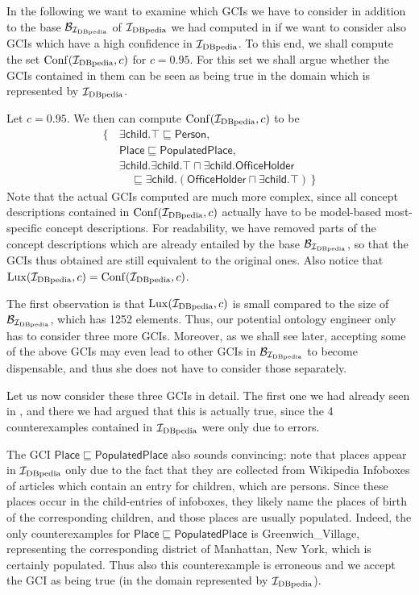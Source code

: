 In the following we want to examine which GCIs we have to consider in addition to the base
$\mathcal{B}_{{\mathcal{I}_{\text{DBpedia}}}}$ of ${\mathcal{I}_{\text{DBpedia}}}$ we had computed in
 if we want to consider also GCIs which have a high
confidence in ${\mathcal{I}_{\text{DBpedia}}}$.  To this end, we shall compute the set $\operatorname{Conf}({\mathcal{I}_{\text{DBpedia}}}, c)$
for $c = 0.95$.  For this set we shall argue whether the GCIs contained in them can be
seen as being true in the domain which is represented by ${\mathcal{I}_{\text{DBpedia}}}$.

Let $c = 0.95$.  We then can compute $\operatorname{Conf}({\mathcal{I}_{\text{DBpedia}}}, c)$ to be
\begin{align*}
  \{\,
  & \mathsf{\exists child. \top} \sqsubseteq \mathsf{Person}, \\
  & \mathsf{Place} \sqsubseteq \mathsf{PopulatedPlace},\\
  & \mathsf{\exists child. \exists child. \top} \sqcap \mathsf{\exists
    child. OfficeHolder} \\
  & \quad \sqsubseteq \mathsf{\exists child. (OfficeHolder \sqcap \exists child. \top)}
  \,\}
\end{align*}
Note that the actual GCIs computed are much more complex, since all concept descriptions
contained in $\operatorname{Conf}({\mathcal{I}_{\text{DBpedia}}}, c)$ actually have to be model-based most-specific concept
descriptions.  For readability, we have removed parts of the concept descriptions which
are already entailed by the base $\mathcal{B}_{\mathcal{I}_{\text{DBpedia}}}$, so that the GCIs thus obtained
are still equivalent to the original ones.  Also notice that $\operatorname{Lux}({\mathcal{I}_{\text{DBpedia}}}, c) =
\operatorname{Conf}({\mathcal{I}_{\text{DBpedia}}}, c)$.

The first observation is that $\operatorname{Lux}({\mathcal{I}_{\text{DBpedia}}}, c)$ is small compared to the size of
$\mathcal{B}_{\mathcal{I}_{\text{DBpedia}}}$, which has 1252 elements.  Thus, our potential ontology engineer
only has to consider three more GCIs.  Moreover, as we shall see later, accepting some of
the above GCIs may even lead to other GCIs in $\mathcal{B}_{\mathcal{I}_{\text{DBpedia}}}$ to become
dispensable, and thus she does not have to consider those separately.

Let us now consider these three GCIs in detail.  The first one we had already seen in
, and there we had argued that this is actually true, since
the 4 counterexamples contained in ${\mathcal{I}_{\text{DBpedia}}}$ were only due to errors.

The GCI $\mathsf{Place} \sqsubseteq \mathsf{PopulatedPlace}$ also sounds convincing: note
that places appear in ${\mathcal{I}_{\text{DBpedia}}}$ only due to the fact that they are collected from
Wikipedia Infoboxes of articles which contain an entry for children, \ie which are
persons.  Since these places occur in the child-entries of infoboxes, they likely name the
places of birth of the corresponding children, and those places are usually populated.
Indeed, the only counterexamples for $\mathsf{Place \sqsubseteq PopulatedPlace}$ is
\textsf{Greenwich\_Village}, representing the corresponding district of Manhattan, New
York, which is certainly populated.  Thus also this counterexample is erroneous and we
accept the GCI as being true (in the domain represented by ${\mathcal{I}_{\text{DBpedia}}}$).

